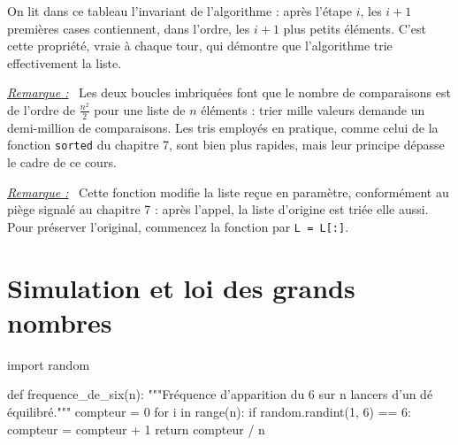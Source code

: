 \documentclass[a4paper,11pt,openany]{book}
\newcommand{\code}[1]{\texttt{\textcolor{codebleu}{#1}}}
\newenvironment{remarque}%
 {\par\vspace{1mm}\begin{list}{}{\leftmargin=1cm \rightmargin=0.5cm}\item[]%
  \textit{\underline{Remarque :}}~}%
 {\end{list}\vspace{1mm}}
\begin{document}
On lit dans ce tableau l'invariant de l'algorithme : après l'étape $i$, les $i+1$ premières cases contiennent, dans l'ordre, les $i+1$ plus petits éléments. C'est cette propriété, vraie à chaque tour, qui démontre que l'algorithme trie effectivement la liste.

\begin{remarque}
Les deux boucles imbriquées font que le nombre de comparaisons est de l'ordre de $\frac{n^2}{2}$ pour une liste de $n$ éléments : trier mille valeurs demande un demi-million de comparaisons. Les tris employés en pratique, comme celui de la fonction \code{sorted} du chapitre 7, sont bien plus rapides, mais leur principe dépasse le cadre de ce cours.
\end{remarque}

\begin{remarque}
Cette fonction modifie la liste reçue en paramètre, conformément au piège signalé au chapitre 7 : après l'appel, la liste d'origine est triée elle aussi. Pour préserver l'original, commencez la fonction par \code{L = L[:]}.
\end{remarque}

\section{Simulation et loi des grands nombres}

\begin{python}
import random

def frequence_de_six(n):
    """Fréquence d'apparition du 6 sur n lancers d'un dé équilibré."""
    compteur = 0
    for i in range(n):
        if random.randint(1, 6) == 6:
            compteur = compteur + 1
    return compteur / n
\end{python}
\end{document}
